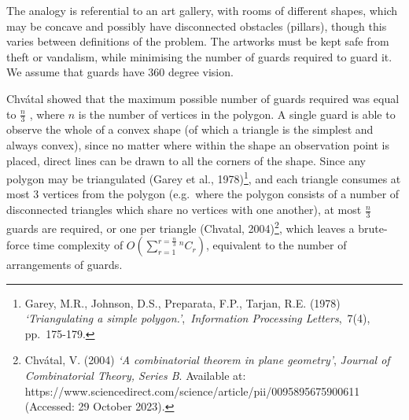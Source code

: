 \documentclass[
]{article}
\begin{document}
The analogy is referential to an art gallery, with rooms of different
shapes, which may be concave and possibly have disconnected obstacles
(pillars), though this varies between definitions of the problem. The
artworks must be kept safe from theft or vandalism, while minimising the
number of guards required to guard it. We assume that guards have 360
degree vision.

Chvátal showed that the maximum possible number of guards required was
equal to \(\frac{n}{3}\) , where \(n\) is the number of vertices in the
polygon. A single guard is able to observe the whole of a convex shape
(of which a triangle is the simplest and always convex), since no matter
where within the shape an observation point is placed, direct lines can
be drawn to all the corners of the shape. Since any polygon may be
triangulated (Garey et al., 1978)\footnote{Garey, M.R., Johnson, D.S.,
  Preparata, F.P., Tarjan, R.E. (1978) \emph{`Triangulating a simple
  polygon.'},~\emph{Information Processing Letters},~7(4), pp.~175-179.},
and each triangle consumes at most 3 vertices from the polygon
(e.g.~where the polygon consists of a number of disconnected triangles
which share no vertices with one another), at most \(\frac{n}{3}\)
guards are required, or one per triangle (Chvatal, 2004)\footnote{Chvátal,
  V. (2004) \emph{`A combinatorial theorem in plane geometry'},
  \emph{Journal of Combinatorial Theory, Series B}. Available at:
  https://www.sciencedirect.com/science/article/pii/0095895675900611
  (Accessed: 29 October 2023).}, which leaves a brute-force time
complexity of \(O(\sum^{r=\frac{n}{3}}_{r=1}{^nC_r})\), equivalent to
the number of arrangements of guards.
\end{document}
